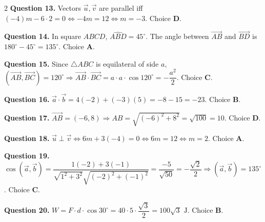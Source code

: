 \documentclass[10pt,a4paper]{article}
\begin{document}
\begin{multicols}{2}
\textbf{Question 13.} Vectors $\vec{u}, \vec{v}$ are parallel iff $(-4)m - 6 \cdot 2 = 0 \Leftrightarrow -4m = 12 \Leftrightarrow m = -3$. Choice \textbf{D}.

\textbf{Question 14.} In square $ABCD$, $\widehat{ABD} = 45^\circ$. The angle between $\vec{AB}$ and $\vec{BD}$ is $180^\circ - 45^\circ = 135^\circ$. Choice \textbf{A}.

\textbf{Question 15.} Since $\triangle ABC$ is equilateral of side $a$, $(\vec{AB}, \vec{BC}) = 120^\circ \Rightarrow \vec{AB} \cdot \vec{BC} = a \cdot a \cdot \cos 120^\circ = -\dfrac{a^2}{2}$. Choice \textbf{C}.

\textbf{Question 16.} $\vec{a} \cdot \vec{b} = 4(-2) + (-3)(5) = -8 - 15 = -23$. Choice \textbf{B}.

\textbf{Question 17.} $\vec{AB} = (-6, 8) \Rightarrow AB = \sqrt{(-6)^2 + 8^2} = \sqrt{100} = 10$. Choice \textbf{D}.

\textbf{Question 18.} $\vec{u} \perp \vec{v} \Leftrightarrow 6m + 3(-4) = 0 \Leftrightarrow 6m = 12 \Leftrightarrow m = 2$. Choice \textbf{A}.

\textbf{Question 19.} $\cos(\vec{a}, \vec{b}) = \dfrac{1(-2) + 3(-1)}{\sqrt{1^2+3^2}\sqrt{(-2)^2+(-1)^2}} = \dfrac{-5}{\sqrt{50}} = -\dfrac{\sqrt{2}}{2} \Rightarrow (\vec{a}, \vec{b}) = 135^\circ$. Choice \textbf{C}.

\textbf{Question 20.} $W = F \cdot d \cdot \cos 30^\circ = 40 \cdot 5 \cdot \dfrac{\sqrt{3}}{2} = 100\sqrt{3}\text{ J}$. Choice \textbf{B}.

\end{multicols}
\newpage
\end{document}
